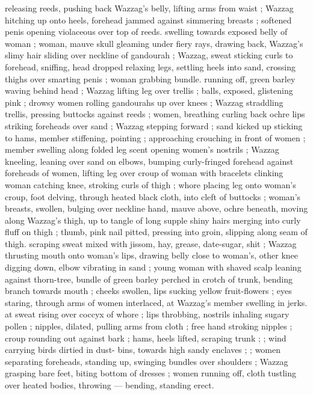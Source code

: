 releasing reeds, pushing back Wazzag's belly, lifting arms from waist 
; Wazzag hitching up onto heels, forehead jammed against simmering 
breasts ; softened penis opening violaceous over top of reeds. 
swelling towards exposed belly of woman ; woman, mauve skull 
gleaming under fiery rays, drawing back, Wazzag's slimy hair sliding 
over neckline of gandourah ; Wazzag, sweat sticking curls to 
forehead, sniffing, head dropped relaxing legs, settling heels into 
sand, crossing thighs over smarting penis ; woman grabbing bundle. 
running off, green barley waving behind head ; Wazzag lifting leg 
over trellis ; balls, exposed, glistening pink ; drowsy women rolling 
gandourahs up over knees ; Wazzag straddling trellis, pressing 
buttocks against reeds ; women, breathing curling back ochre lips 
striking foreheads over sand ; Wazzag stepping forward ; sand kicked 
up sticking to hams, member stiffening, pointing ; approaching 
crouching in front of women ; member swelling along folded leg 
scent opening women's nostrils ; Wazzag kneeling, leaning over sand 
on elbows, bumping curly-fringed forehead against foreheads of 
women, lifting leg over croup of woman with bracelets clinking 
woman catching knee, stroking curls of thigh ; whore placing leg 
onto woman's croup, foot delving, through heated black cloth, into 
cleft of buttocks ; woman's breasts, swollen, bulging over neckline 
hand, mauve above, ochre beneath, moving along Wazzag's thigh, up 
to tangle of long supple shiny hairs merging into curly fluff on thigh 
; thumb, pink nail pitted, pressing into groin, slipping along seam of 
thigh. scraping sweat mixed with jissom, hay, grease, date-sugar, shit 
; Wazzag thrusting mouth onto woman's lips, drawing belly close to 
woman's, other knee digging down, elbow vibrating in sand ; young 
woman with shaved scalp leaning against thorn-tree, bundle of green 
barley perched in crotch of trunk, bending branch towards mouth ; 
cheeks swollen, lips sucking yellow fruit-flowers ; eyes staring, 
through arms of women interlaced, at Wazzag's member swelling in 
jerks. at sweat rising over coccyx of whore ; lips throbbing, nostrils 
inhaling sugary pollen ; nipples, dilated, pulling arms from cloth ; 
free hand stroking nipples ; croup rounding out against bark ; hams, 
heels lifted, scraping trunk ; ; wind carrying birds dirtied in dust- 
bins, towards high sandy enclaves ; ; women separating foreheads, 
standing up, swinging bundles over shoulders ; Wazzag grasping 
bare feet, biting bottom of dresses ; women running off, cloth 
tustling over heated bodies, throwing --- bending, standing erect. 

